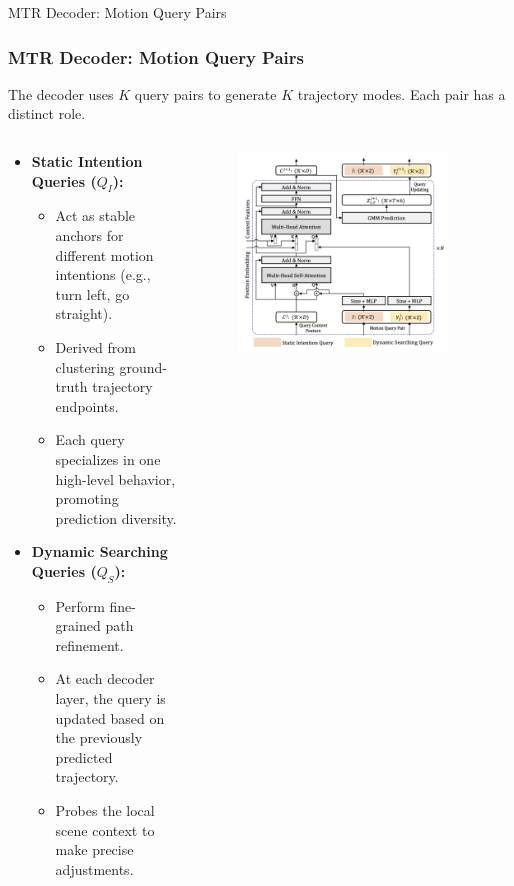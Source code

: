 \documentclass[10pt,aspectratio=169]{beamer}
\begin{document}
\begin{frame}{MTR Decoder: Motion Query Pairs}
    \frametitle{MTR Decoder: Motion Query Pairs}
    The decoder uses $K$ query pairs to generate $K$ trajectory modes. Each pair has a distinct role.
    \begin{columns}[T]
        \begin{column}{0.6\textwidth}
            \begin{itemize}
                \item\textbf{Static Intention Queries ($Q_I$):}
                \begin{itemize}
                    \item Act as stable anchors for different motion intentions (e.g., turn left, go straight).
                    \item Derived from clustering ground-truth trajectory endpoints.
                    \item Each query specializes in one high-level behavior, promoting prediction diversity.
                \end{itemize}
                \item\textbf{Dynamic Searching Queries ($Q_S$):}
                \begin{itemize}
                    \item Perform fine-grained path refinement.
                    \item At each decoder layer, the query is updated based on the previously predicted trajectory.
                    \item Probes the local scene context to make precise adjustments.
                \end{itemize}
            \end{itemize}
        \end{column}
        \begin{column}{0.4\textwidth}
            \begin{figure}
                \centering
                \includegraphics[width=0.9\textwidth]{docs/latex/figures/decoder_layer_detail.png}

\end{figure}
\end{column}
\end{columns}
\end{frame}
\end{document}
